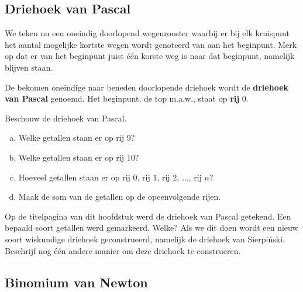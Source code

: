 \documentclass[12pt,a4paper,twoside]{article}
\makeatletter
\newcommand\binomialCoefficient[2]{%
    \c@pgf@counta=#1%
    \c@pgf@countb=#2%
    \c@pgf@countc=\c@pgf@counta%
    \advance\c@pgf@countc by-\c@pgf@countb%
    \ifnum\c@pgf@countb>\c@pgf@countc%
        \c@pgf@countb=\c@pgf@countc%
    \fi%
    \c@pgf@countc=1%
    \c@pgf@countd=0%
    \pgfmathloop%
        \ifnum\c@pgf@countd<\c@pgf@countb%
        \multiply\c@pgf@countc by\c@pgf@counta%
        \advance\c@pgf@counta by-1%
        \advance\c@pgf@countd by1%
        \divide\c@pgf@countc by\c@pgf@countd%
    \repeatpgfmathloop%
    \the\c@pgf@countc%
}
\makeatother
\begin{document}
\pagebreak
\subsection{Driehoek van Pascal}

We teken nu een oneindig doorlopend wegenrooster waarbij er bij elk kruispunt het aantal mogelijke kortste wegen wordt genoteerd van aan het beginpunt. Merk op dat er van het beginpunt juist één korste weg is naar dat beginpunt, namelijk blijven staan.

\vspace*{1cm}
\begin{center}
\end{center}
\vspace*{1cm}

\begin{mdframed}
De bekomen oneindige naar beneden doorlopende driehoek wordt de {\bf driehoek van Pascal} genoemd. Het beginpunt, de top m.a.w., staat op {\bf rij} 0.
\end{mdframed}

\begin{oefening}
Beschouw de driehoek van Pascal.
\begin{enumerate}[(a)]
  \item Welke getallen staan er op rij 9?
  \item Welke getallen staan er op rij 10?
  \item Hoeveel getallen staan er op rij $0$, rij $1$, rij $2$, $\ldots$, rij $n$?
  \item Maak de som van de getallen op de opeenvolgende rijen.
\end{enumerate}
\end{oefening}

\begin{oefening}
Op de titelpagina van dit hoofdstuk werd de driehoek van Pascal getekend. Een bepaald soort getallen werd gemarkeerd. Welke? Als we dit doen wordt een nieuw soort wiskundige driehoek geconstrueerd, namelijk de driehoek van Sierpiński. Beschrijf nog één andere manier om deze driehoek te construeren.
\end{oefening}

\subsection{Binomium van Newton}
\end{document}
